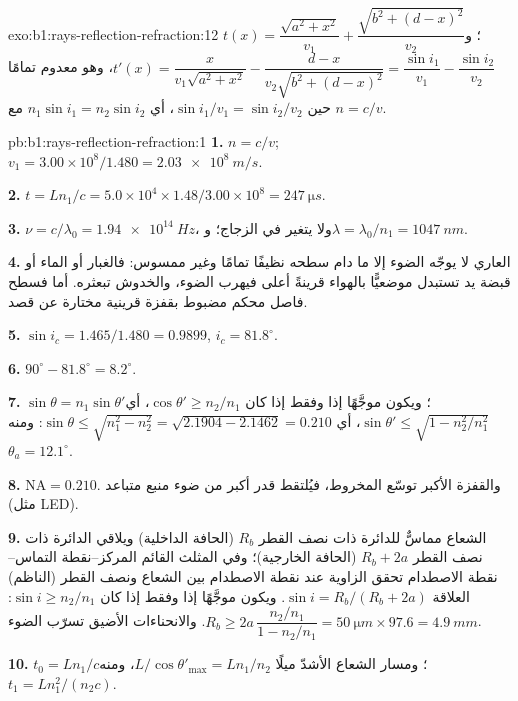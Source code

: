 \begin{solution}{exo:b1:rays-reflection-refraction:12}
$t(x) = \dfrac{\sqrt{a^2 + x^2}}{v_1} + \dfrac{\sqrt{b^2 + (d - x)^2}}{v_2}$؛
و$t'(x) = \dfrac{x}{v_1\sqrt{a^2 + x^2}} - \dfrac{d - x}{v_2\sqrt{b^2 + (d - x)^2}}
= \dfrac{\sin i_1}{v_1} - \dfrac{\sin i_2}{v_2}$، وهو معدوم تمامًا حين
$\sin i_1/v_1 = \sin i_2/v_2$، أي $n_1\sin i_1 = n_2\sin i_2$ مع
$n = c/v$.
\end{solution}

\begin{solution}{pb:b1:rays-reflection-refraction:1}
\textbf{1.} $n = c/v$; $v_1 = 3.00\times10^8/1.480 = \qty{2.03e8}{m/s}$.

\textbf{2.} $t = Ln_1/c = 5.0\times10^4 \times 1.48/3.00\times10^8 =
\qty{247}{\micro s}$.

\textbf{3.} $\nu = c/\lambda_0 = \qty{1.94e14}{Hz}$، ولا يتغير في الزجاج؛
و$\lambda = \lambda_0/n_1 = \qty{1047}{nm}$.

\textbf{4.}  العاري لا يوجّه الضوء إلا ما دام سطحه نظيفًا تمامًا
وغير ممسوس: فالغبار أو الماء أو قبضة يد تستبدل موضعيًّا بالهواء قرينةً
أعلى فيهرب الضوء، والخدوش تبعثره. أما  فسطح فاصل محكم مضبوط
بقفزة قرينية مختارة عن قصد.

\textbf{5.} $\sin i_c = 1.465/1.480 = 0.9899$, $i_c = 81.8^\circ$.

\textbf{6.} $90^\circ - 81.8^\circ = 8.2^\circ$.

\textbf{7.} $\sin\theta = n_1\sin\theta'$؛ ويكون موجَّهًا إذا وفقط إذا كان $\cos\theta' \geq
n_2/n_1$، أي $\sin\theta' \leq \sqrt{1 - n_2^2/n_1^2}$، أي
$\sin\theta \leq \sqrt{n_1^2 - n_2^2} = \sqrt{2.1904 - 2.1462} = 0.210$:
ومنه $\theta_a = 12.1^\circ$.

\textbf{8.} $\mathrm{NA} = 0.210$. والقفزة الأكبر توسّع المخروط، فيُلتقط
قدر أكبر من ضوء منبع متباعد (مثل LED).

\textbf{9.} الشعاع مماسٌّ للدائرة ذات نصف القطر $R_b$ (الحافة
الداخلية) ويلاقي الدائرة ذات نصف القطر $R_b + 2a$ (الحافة الخارجية)؛ وفي
المثلث القائم المركز--نقطة التماس--نقطة الاصطدام تحقق الزاوية عند
نقطة الاصطدام بين الشعاع ونصف القطر (الناظم) العلاقة
$\sin i = R_b/(R_b + 2a)$. ويكون موجَّهًا إذا وفقط إذا كان $\sin i \geq n_2/n_1$:
$R_b \geq 2a\,\dfrac{n_2/n_1}{1 - n_2/n_1} = \qty{50}{\micro m} \times 97.6
= \qty{4.9}{mm}$. والانحناءات الأضيق تسرّب الضوء.

\textbf{10.} $t_0 = Ln_1/c$؛ ومسار الشعاع الأشدّ ميلًا $L/\cos\theta'_{\max} =
Ln_1/n_2$، ومنه $t_1 = Ln_1^2/(n_2 c)$.


\end{solution}

